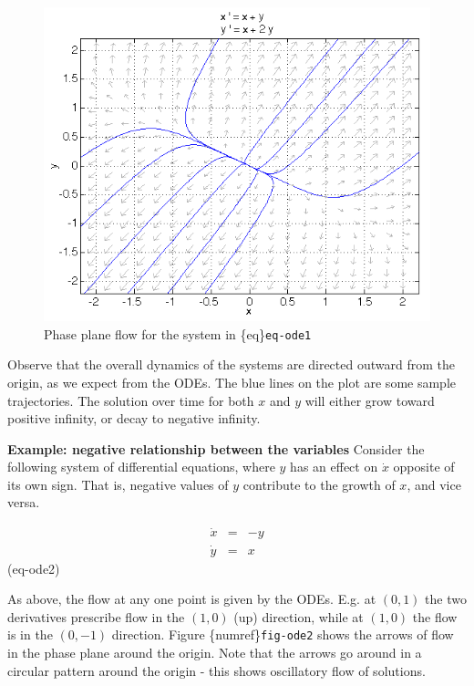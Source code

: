 \documentclass[
  letterpaper,
  DIV=11,
  numbers=noendperiod]{scrreprt}
\begin{document}
\begin{figure}

{\centering \includegraphics{./images/week6_pp5.png}

}

\caption{Phase plane flow for the system in \{eq\}\texttt{eq-ode1}}

\end{figure}

Observe that the overall dynamics of the systems are directed outward
from the origin, as we expect from the ODEs. The blue lines on the plot
are some sample trajectories. The solution over time for both \(x\) and
\(y\) will either grow toward positive infinity, or decay to negative
infinity.

\textbf{Example: negative relationship between the variables} Consider
the following system of differential equations, where \(y\) has an
effect on \(\dot x\) opposite of its own sign. That is, negative values
of \(y\) contribute to the growth of \(x\), and vice versa.

\[
\begin{aligned}
\dot x & = & -y \\
\dot y & = & x  
\end{aligned}
\] (eq-ode2)

As above, the flow at any one point is given by the ODEs. E.g. at
\((0,1)\) the two derivatives prescribe flow in the \((1,0)\) (up)
direction, while at \((1,0)\) the flow is in the \((0,-1)\) direction.
Figure \{numref\}\texttt{fig-ode2} shows the arrows of flow in the phase
plane around the origin. Note that the arrows go around in a circular
pattern around the origin - this shows oscillatory flow of solutions.
\end{document}
